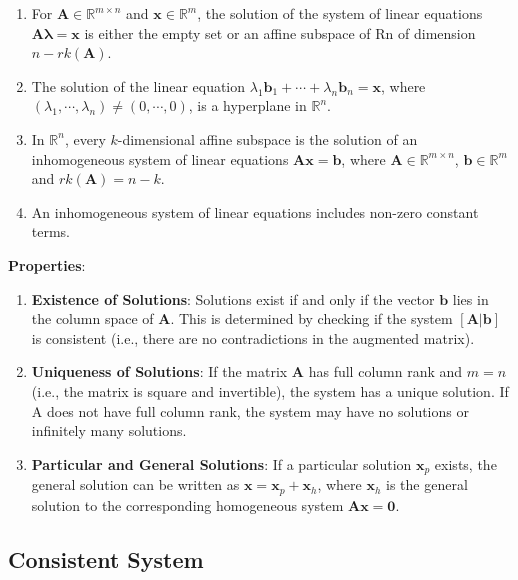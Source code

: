 \begin{enumerate}
    \item For $\mathbf{A} \in \mathbb{R}^{m\times n}$ and $\mathbf{x} \in \mathbb{R}^m$, the solution of the system of linear equations $\mathbf{A\boldsymbol{\lambda} = x}$ is either the empty set or an affine subspace of Rn of dimension $n - rk(\mathbf{A})$.

    \item The solution of the linear equation $\lambda_1\mathbf{b}_1 + \cdots + \lambda_n\mathbf{b}_n = \mathbf{x}$, where $(\lambda_1, \cdots , \lambda_n) \neq (0, \cdots , 0)$, is a hyperplane in $\mathbb{R}^n$.

    \item In $\mathbb{R}^n$, every $k$-dimensional affine subspace is the solution of an inhomogeneous system of linear equations $\mathbf{Ax = b}$, where $\mathbf{A} \in \mathbb{R}^{m\times n}$, $\mathbf{b} \in \mathbb{R}^m$ and $rk(\mathbf{A}) = n - k$.

    \item An inhomogeneous system of linear equations includes non-zero constant terms.
\end{enumerate}

\vspace{0.2cm}
\textbf{Properties}:
\begin{enumerate}
    \item \textbf{Existence of Solutions}: Solutions exist if and only if the vector $\mathbf{b}$ lies in the column space of $\mathbf{A}$. This is determined by checking if the system $\mathbf{[A|b]}$ is consistent (i.e., there are no contradictions in the augmented matrix).

    \item \textbf{Uniqueness of Solutions}: If the matrix $\mathbf{A}$ has full column rank and $m=n$ (i.e., the matrix is square and invertible), the system has a unique solution. If A does not have full column rank, the system may have no solutions or infinitely many solutions.

    \item \textbf{Particular and General Solutions}: If a particular solution $\mathbf{x}_p$ exists, the general solution can be written as $\mathbf{x}=\mathbf{x}_p +\mathbf{x}_h$, where $\mathbf{x}_h$ is the general solution to the corresponding homogeneous system $\mathbf{Ax=0}$.
\end{enumerate}

\subsection{Consistent System}\label{Consistent System of equations}

